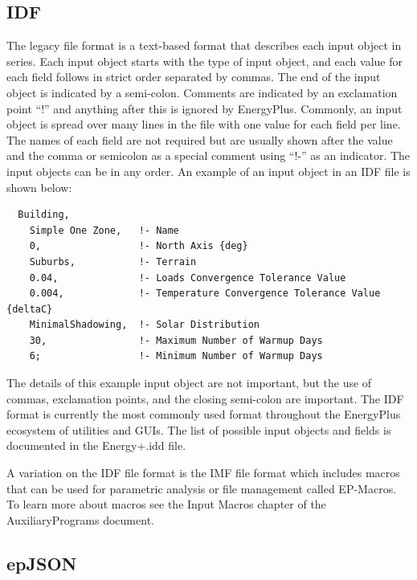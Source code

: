 \subsection*{IDF}

The legacy file format is a text-based format that describes each
input object in series. Each input object starts with the type of
input object, and each value for each field follows in strict order
separated by commas. The end of the input object is indicated by a
semi-colon. Comments are indicated by an exclamation point ``!''
and anything after this is ignored by EnergyPlus. Commonly, an input
object is spread over many lines in the file with one value for each
field per line. The names of each field are not required but are usually
shown after the value and the comma or semicolon as a special comment
using ``!-'' as an indicator. The input objects can be in any order.
An example of an input object in an IDF file is shown below: 
\begin{verbatim}
  Building,
    Simple One Zone,   !- Name
    0,                 !- North Axis {deg}
    Suburbs,           !- Terrain
    0.04,              !- Loads Convergence Tolerance Value
    0.004,             !- Temperature Convergence Tolerance Value {deltaC}
    MinimalShadowing,  !- Solar Distribution
    30,                !- Maximum Number of Warmup Days
    6;                 !- Minimum Number of Warmup Days
\end{verbatim}
The details of this example input object are not important, but the
use of commas, exclamation points, and the closing semi-colon are
important. The IDF format is currently the most commonly used format
throughout the EnergyPlus ecosystem of utilities and GUIs. The list
of possible input objects and fields is documented in the Energy+.idd
file.

A variation on the IDF file format is the IMF file format which includes
macros that can be used for parametric analysis or file management
called EP-Macros. To learn more about macros see the Input Macros
chapter of the AuxiliaryPrograms document.

\subsection*{epJSON}

